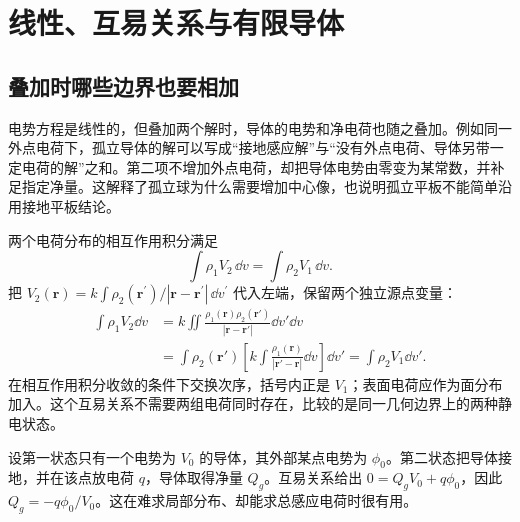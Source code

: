 \section{线性、互易关系与有限导体}
\subsection{叠加时哪些边界也要相加}

电势方程是线性的，但叠加两个解时，导体的电势和净电荷也随之叠加。例如同一外点电荷下，孤立导体的解可以写成“接地感应解”与“没有外点电荷、导体另带一定电荷的解”之和。第二项不增加外点电荷，却把导体电势由零变为某常数，并补足指定净量。这解释了孤立球为什么需要增加中心像，也说明孤立平板不能简单沿用接地平板结论。

两个电荷分布的相互作用积分满足
\[
 \int \rho_1 V_2\,\dd v=\int\rho_2 V_1\,\dd v.
\]
把 $V_2(\bm r)=k\int\rho_2(\bm r^\prime)/|\bm r-\bm r^\prime|\,\dd v^\prime$
代入左端，保留两个独立源点变量：
\begin{align*}
 \int \rho_1V_2\dd v
 &=k\iint\frac{\rho_1(\bm r)\rho_2(\bm r')}
                 {|\bm r-\bm r'|}\dd v'\dd v\\
 &=\int\rho_2(\bm r')
    \left[k\int\frac{\rho_1(\bm r)}{|\bm r'-\bm r|}\dd v\right]\dd v'
 =\int\rho_2V_1\dd v'.
\end{align*}
在相互作用积分收敛的条件下交换次序，括号内正是 $V_1$；表面电荷应作为面分布加入。这个互易关系不需要两组电荷同时存在，比较的是同一几何边界上的两种静电状态。

设第一状态只有一个电势为 $V_0$ 的导体，其外部某点电势为 $\phi_0$。第二状态把导体接地，并在该点放电荷 $q$，导体取得净量 $Q_g$。互易关系给出 $0=Q_gV_0+q\phi_0$，因此 $Q_g=-q\phi_0/V_0$。这在难求局部分布、却能求总感应电荷时很有用。


